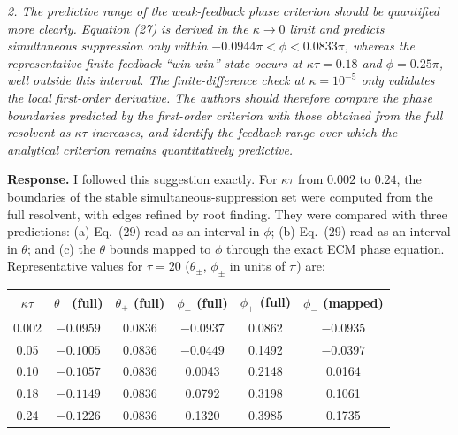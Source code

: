 \documentclass[11pt]{article}
\newenvironment{comment}{\par\medskip\noindent\begin{minipage}{\linewidth}\color{rc}\itshape}{\end{minipage}\par\smallskip}
\newcommand{\resp}{\noindent\textbf{Response.} }
\begin{document}
\begin{comment}2. The predictive range of the weak-feedback phase criterion should be quantified more clearly. Equation (27) is derived in the $\kappa\to0$ limit and predicts simultaneous suppression only within $-0.0944\pi<\phi<0.0833\pi$, whereas the representative finite-feedback ``win-win'' state occurs at $\kappa\tau=0.18$ and $\phi=0.25\pi$, well outside this interval. The finite-difference check at $\kappa=10^{-5}$ only validates the local first-order derivative. The authors should therefore compare the phase boundaries predicted by the first-order criterion with those obtained from the full resolvent as $\kappa\tau$ increases, and identify the feedback range over which the analytical criterion remains quantitatively predictive.\end{comment}
\resp I followed this suggestion exactly. For $\kappa\tau$ from $0.002$ to $0.24$, the boundaries of the stable simultaneous-suppression set were computed from the full resolvent, with edges refined by root finding. They were compared with three predictions: (a) Eq.~(29) read as an interval in $\phi$; (b) Eq.~(29) read as an interval in $\theta$; and (c) the $\theta$ bounds mapped to $\phi$ through the exact ECM phase equation. Representative values for $\tau=20$ ($\theta_\pm$, $\phi_\pm$ in units of $\pi$) are:

\begin{center}
\begin{tabular}{cccccc}
\toprule
$\kappa\tau$ & $\theta_-$ (full) & $\theta_+$ (full) & $\phi_-$ (full) & $\phi_+$ (full) & $\phi_-$ (mapped)\\
\midrule
0.002 & $-0.0959$ & 0.0836 & $-0.0937$ & 0.0862 & $-0.0935$\\
0.05 & $-0.1005$ & 0.0836 & $-0.0449$ & 0.1492 & $-0.0397$\\
0.10 & $-0.1057$ & 0.0836 & 0.0043 & 0.2148 & 0.0164\\
0.18 & $-0.1149$ & 0.0836 & 0.0792 & 0.3198 & 0.1061\\
0.24 & $-0.1226$ & 0.0836 & 0.1320 & 0.3985 & 0.1735\\
\bottomrule
\end{tabular}
\end{center}
\end{document}
